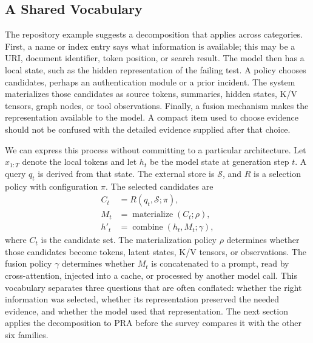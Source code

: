 \documentclass[10pt,a4paper]{article}
\begin{document}
\subsection{A Shared Vocabulary}
The repository example suggests a decomposition that applies across categories.  First,
a name or index entry says what information is available; this may be a URI, document
identifier, token position, or search result.  The model then has a local state, such as
the hidden representation of the failing test. A policy chooses candidates, perhaps an authentication module or a prior incident. The system materializes those candidates as source tokens, summaries, hidden states, K/V tensors, graph nodes, or tool observations. Finally, a fusion mechanism makes the representation available to the model.  A compact
item used to choose evidence should not be confused with the detailed evidence supplied
after that choice.

We can express this process without committing to a particular architecture. Let $x_{1:T}$ denote the local tokens and let $h_t$ be the model state at generation step $t$. A query $q_t$ is derived from that state. The external store is $\mathcal{S}$, and $R$ is a selection policy with configuration $\pi$. The selected candidates are
\begin{align}
C_t &= R(q_t,\mathcal{S};\pi),\\
M_t &= \operatorname{materialize}(C_t;\rho),\\
h'_t &= \operatorname{combine}(h_t,M_t;\gamma),
\end{align}
where $C_t$ is the candidate set. The materialization policy $\rho$ determines whether those candidates become tokens, latent states, K/V tensors, or observations. The fusion policy $\gamma$ determines whether $M_t$ is concatenated to a prompt, read by cross-attention, injected into a cache, or processed by another model call. This vocabulary separates three questions that are often conflated: whether the right information was selected, whether its representation preserved the needed evidence, and whether the model used that representation. The next section applies the decomposition to PRA before the survey compares it with the other six families.
\end{document}
